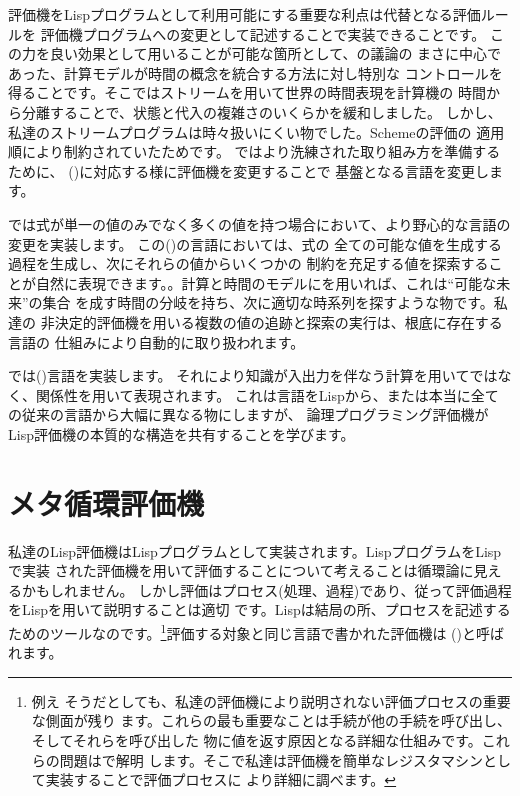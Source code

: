 評価機をLispプログラムとして利用可能にする重要な利点は代替となる評価ルールを
評価機プログラムへの変更として記述することで実装できることです。
この力を良い効果として用いることが可能な箇所として、の議論の
まさに中心であった、計算モデルが時間の概念を統合する方法に対し特別な
コントロールを得ることです。そこではストリームを用いて世界の時間表現を計算機の
時間から分離することで、状態と代入の複雑さのいくらかを緩和しました。
しかし、私達のストリームプログラムは時々扱いにくい物でした。Schemeの評価の
適用順により制約されていたためです。
ではより洗練された取り組み方を準備するために、
()に対応する様に評価機を変更することで
基盤となる言語を変更します。


では式が単一の値のみでなく多くの値を持つ場合において、より野心的な言語の変更を実装します。
この()の言語においては、式の
全ての可能な値を生成する過程を生成し、次にそれらの値からいくつかの
制約を充足する値を探索することが自然に表現できます。。計算と時間のモデルにを用いれば、これは``可能な未来''の集合
を成す時間の分岐を持ち、次に適切な時系列を探すような物です。私達の
非決定的評価機を用いる複数の値の追跡と探索の実行は、根底に存在する言語の
仕組みにより自動的に取り扱われます。



では()言語を実装します。
それにより知識が入出力を伴なう計算を用いてではなく、関係性を用いて表現されます。
これは言語をLispから、または本当に全ての従来の言語から大幅に異なる物にしますが、
論理プログラミング評価機がLisp評価機の本質的な構造を共有することを学びます。



\section{メタ循環評価機}
\label{Section 4.1}



私達のLisp評価機はLispプログラムとして実装されます。LispプログラムをLispで実装
された評価機を用いて評価することについて考えることは循環論に見えるかもしれません。
しかし評価はプロセス(処理、過程)であり、従って評価過程をLispを用いて説明することは適切
です。Lispは結局の所、プロセスを記述するためのツールなのです。\footnote{例え
そうだとしても、私達の評価機により説明されない評価プロセスの重要な側面が残り
ます。これらの最も重要なことは手続が他の手続を呼び出し、そしてそれらを呼び出した
物に値を返す原因となる詳細な仕組みです。これらの問題はで解明
します。そこで私達は評価機を簡単なレジスタマシンとして実装することで評価プロセスに
より詳細に調べます。}評価する対象と同じ言語で書かれた評価機は
()と呼ばれます。


